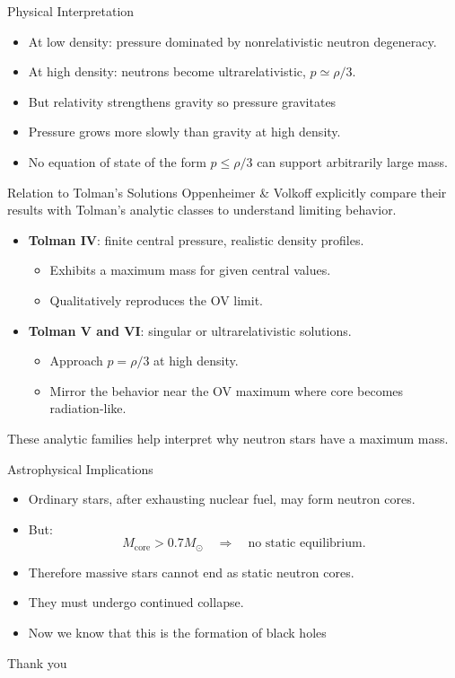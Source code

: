 \documentclass[11pt]{beamer}
\begin{document}
\begin{frame}{Physical Interpretation}
  \begin{itemize}
    \item At low density: pressure dominated by nonrelativistic neutron degeneracy.
    \item At high density: neutrons become ultrarelativistic, $p \simeq \rho/3$.
    \item But relativity strengthens gravity so pressure gravitates
    \item Pressure grows more slowly than gravity at high density.
    \item No equation of state of the form $p \le \rho/3$ can support arbitrarily large mass.
  \end{itemize}
\end{frame}

\begin{frame}{Relation to Tolman's Solutions}
  \small
  Oppenheimer \& Volkoff explicitly compare their results with Tolman's
  analytic classes to understand limiting behavior.
  \begin{itemize}
    \item \textbf{Tolman IV}: finite central pressure, realistic density profiles.
      \begin{itemize}
        \item Exhibits a maximum mass for given central values.
        \item Qualitatively reproduces the OV limit.
      \end{itemize}
    \item \textbf{Tolman V and VI}: singular or ultrarelativistic solutions.
      \begin{itemize}
        \item Approach $p = \rho/3$ at high density.
        \item Mirror the behavior near the OV maximum where core becomes radiation-like.
      \end{itemize}
  \end{itemize}

  \medskip
  These analytic families help interpret why neutron stars have a maximum mass.
\end{frame}

\begin{frame}{Astrophysical Implications}
  \begin{itemize}
    \item Ordinary stars, after exhausting nuclear fuel, may form neutron cores.
    \item But:
      \[
        M_{\mathrm{core}} > 0.7 M_\odot \quad \Rightarrow \quad \text{no static equilibrium}.
      \]
    \item Therefore massive stars cannot end as static neutron cores.
    \item They must undergo continued collapse.
    \item Now we know that this is the formation of black holes
  \end{itemize}
\end{frame}

\begin{frame}
  \LARGE
  \center
  Thank you
\end{frame}
\end{document}
